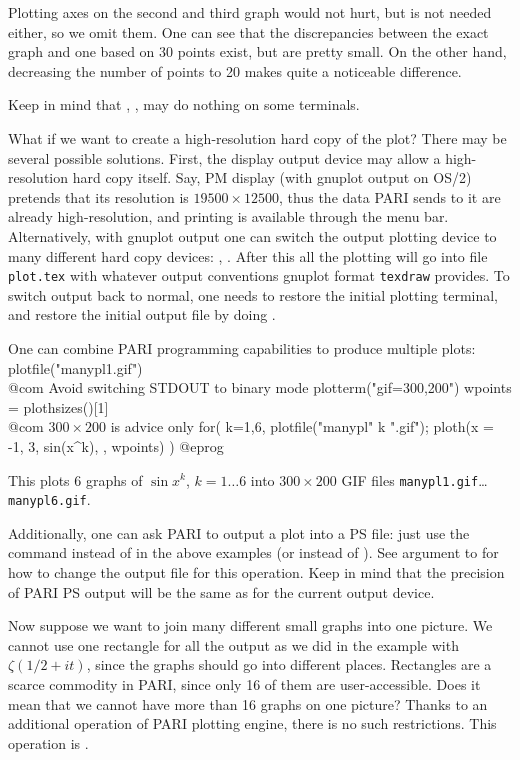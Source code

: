 \noindent Plotting axes on the second and third graph would not hurt, but
is not needed either, so we omit them.  One can see that the discrepancies
between the exact graph and one based on 30 points exist, but are pretty
small.  On the other hand, decreasing the number of points to 20 makes
quite a noticeable difference.

Keep in mind that , ,
 may do nothing on some terminals.

What if we
want to create a high-resolution hard copy of the plot?  There may be several
possible solutions.  First, the display output device may allow a
high-resolution hard copy itself.  Say, PM display (with gnuplot output on
OS/2) pretends that its resolution is $19500\times 12500$, thus the data
PARI sends to it are already high-resolution, and printing is available
through the menu bar.  Alternatively, with gnuplot output one can switch
the output plotting device to many different hard copy devices:
, .
After this all the plotting will go into file {\tt plot.tex} with whatever
output conventions gnuplot format {\tt texdraw} provides.  To switch output
back to normal, one needs to restore the initial plotting terminal, and
restore the initial output file by doing .

One can combine PARI programming capabilities to produce multiple plots:
\bprog
  plotfile("manypl1.gif")       \\@com Avoid switching STDOUT to binary mode
  plotterm("gif=300,200")
  wpoints = plothsizes()[1]     \\@com $300 \times 200$ is advice only
  {
    for( k=1,6,
      plotfile("manypl" k ".gif");
      ploth(x = -1, 3, sin(x^k), , wpoints)
    )
  }
@eprog

\noindent This plots 6 graphs of $\sin x^k$, $k=1\dots 6$ into
$300\times 200$ GIF files {\tt manypl1.gif}\dots {\tt manypl6.gif}.

Additionally, one can ask PARI to output a plot into a PS file: just
use the command  instead of  in the above examples
(or  instead of ).  See  argument
to  for how to change the output file for this operation.  Keep
in mind that the precision of PARI PS output will be the same as for the
current output device.

Now suppose we want to join many different small graphs into one picture.
We cannot use one rectangle for all the output as we did in the example
with $\zeta({1/2}+it)$, since the graphs should go into different places.
Rectangles are a scarce commodity in PARI, since only 16 of them are
user-accessible.  Does it mean that we cannot have more than 16 graphs on
one picture?  Thanks to an additional operation of PARI plotting engine,
there is no such restrictions.  This operation is .


